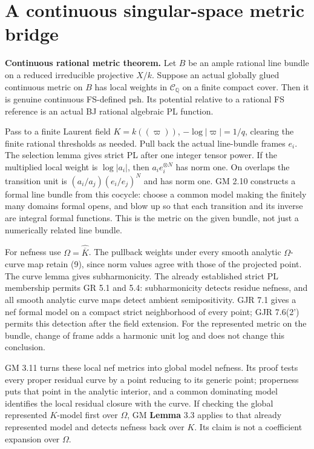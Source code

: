 \documentclass[
  11pt,
]{article}
\begin{document}
\section{A continuous singular-space metric
bridge}\label{a-continuous-singular-space-metric-bridge}

\textbf{Continuous rational metric theorem.} Let \(B\) be an ample
rational line bundle on a reduced irreducible projective \(X/k\).
Suppose an actual globally glued continuous metric on \(B\) has local
weights in \(\mathcal C_{\mathbb Q}\) on a finite compact cover. Then it
is genuine continuous FS-defined psh. Its potential relative to a
rational FS reference is an actual BJ rational algebraic PL function.

Pass to a finite Laurent field \(K=k((\varpi))\), \(-\log|\varpi|=1/q\),
clearing the finite rational thresholds as needed. Pull back the actual
line-bundle frames \(e_i\). The selection lemma gives strict PL after
one integer tensor power. If the multiplied local weight is
\(\log|a_i|\), then \(a_i e_i^{\otimes N}\) has norm one. On overlaps
the transition unit is \((a_i/a_j)(e_i/e_j)^N\) and has norm one. GM
2.10 constructs a formal line bundle from this cocycle: choose a common
model making the finitely many domains formal opens, and blow up so that
each transition and its inverse are integral formal functions. This is
the metric on the given bundle, not just a numerically related line
bundle.

For nefness use \(\Omega=\widehat{\overline K}\). The pullback weights
under every smooth analytic \(\Omega\)-curve map retain (9), since norm
values agree with those of the projected point. The curve lemma gives
subharmonicity. The already established strict PL membership permits GR
5.1 and 5.4: subharmonicity detects residue nefness, and all smooth
analytic curve maps detect ambient semipositivity. GJR 7.1 gives a nef
formal model on a compact strict neighborhood of every point; GJR
7.6(2') permits this detection after the field extension. For the
represented metric on the bundle, change of frame adds a harmonic unit
log and does not change this conclusion.

GM 3.11 turns these local nef metrics into global model nefness. Its
proof tests every proper residual curve by a point reducing to its
generic point; properness puts that point in the analytic interior, and
a common dominating model identifies the local residual closure with the
curve. If checking the global represented \(K\)-model first over
\(\Omega\), GM \textbf{Lemma} 3.3 applies to that already represented
model and detects nefness back over \(K\). Its claim is not a
coefficient expansion over \(\Omega\).
\end{document}
